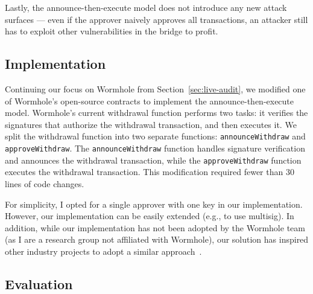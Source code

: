 Lastly, the announce-then-execute model does not
introduce any new attack surfaces --- even if the approver naively
approves all transactions, an attacker still has to exploit other
vulnerabilities in the bridge to profit.

\subsection{Implementation}


Continuing our focus on Wormhole from Section~\ref{sec:live-audit}, we
modified one of Wormhole's open-source contracts to implement the
announce-then-execute model.  Wormhole's current withdrawal function
performs two tasks: it verifies the signatures that authorize the
withdrawal transaction, and then executes it. We
split the withdrawal function into two separate functions:
\texttt{announceWithdraw} and \texttt{approveWithdraw}. The
\texttt{announceWithdraw} function handles signature verification and
announces the withdrawal transaction,
while the \texttt{approveWithdraw} function executes the withdrawal
transaction. This modification required fewer than 30 lines of code
changes.

For simplicity, I opted for a single approver with one key in our implementation. However, our implementation can be easily extended (e.g., to use multisig). In addition, while our implementation has not been adopted by the Wormhole team (as I are a research group not affiliated with Wormhole), our solution has inspired other industry projects to adopt a similar approach~\cite{bascule}.

\subsection{Evaluation}


